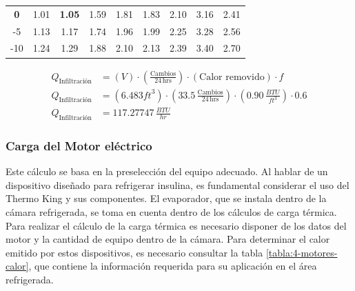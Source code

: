 \begin{table}[H]
\begin{tabular}{ccccccccc}
 			{\color[HTML]{DA8292} \textbf{0}}                                                                             & 1.01 & {\color[HTML]{DA8292} \textbf{1.05}} & 1.59       & 1.81      & 1.83       & 2.10      & 3.16       & 2.41       \\
 			-5                                                                                                            & 1.13 & 1.17                                 & 1.74       & 1.96      & 1.99       & 2.25      & 3.28       & 2.56       \\
 			-10                                                                                                           & 1.24 & 1.29                                 & 1.88       & 2.10      & 2.13       & 2.39      & 3.40       & 2.70       \\ \hline
 		\end{tabular}
 	\end{table}
 	
 	
 	
 	\begin{equation}
 		\begin{aligned}
 			Q_{\text{Infiltración}} &= (V) \cdot \left( \frac{\text{Cambios}}{24 \, \text{hrs}} \right) \cdot (\text{Calor removido}) \cdot f \\
 			Q_{\text{Infiltración}} &= (6.483 {ft}^3) \cdot \left( 33.5 \, \frac{\text{Cambios}}{24 \, \text{hrs}} \right) \cdot \left(0.90  \, \frac{{BTU}}{{ft}^3} \right) \cdot 0.6 \\
 			Q_{\text{Infiltración}} &=117.27747\, \frac{{BTU}}{{hr}}
 		\end{aligned}
 	\end{equation}
 	
 	
 	
 	\subsubsection{Carga del Motor eléctrico}
 	
 	Este cálculo se basa en la preselección del equipo adecuado. Al hablar de un dispositivo diseñado para refrigerar insulina, es fundamental considerar el uso del Thermo King y sus componentes. El evaporador, que se instala dentro de la cámara refrigerada, se toma en cuenta dentro de los cálculos de carga térmica.\\
 	Para realizar el cálculo de la carga térmica es necesario disponer de los datos del motor y la cantidad de equipo dentro de la cámara. Para determinar el calor emitido por estos dispositivos, es necesario consultar la tabla \ref{tabla:4-motores-calor}, que contiene la información requerida para su aplicación en el área refrigerada.
 	
